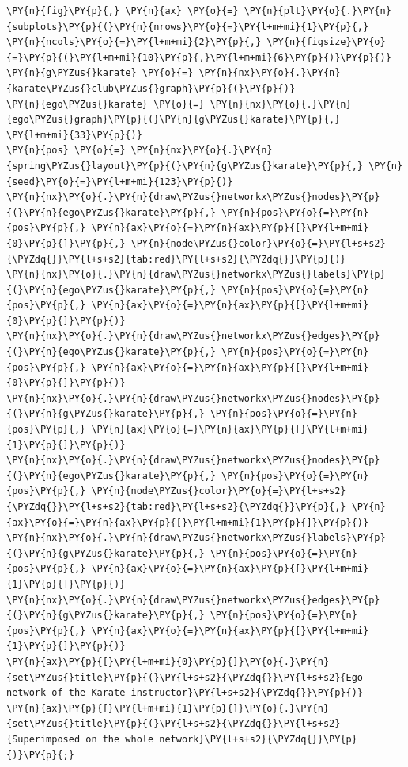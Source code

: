     \begin{tcolorbox}[breakable, size=fbox, boxrule=1pt, pad at break*=1mm,colback=cellbackground, colframe=cellborder]
\begin{Verbatim}[commandchars=\\\{\}]
\PY{n}{fig}\PY{p}{,} \PY{n}{ax} \PY{o}{=} \PY{n}{plt}\PY{o}{.}\PY{n}{subplots}\PY{p}{(}\PY{n}{nrows}\PY{o}{=}\PY{l+m+mi}{1}\PY{p}{,} \PY{n}{ncols}\PY{o}{=}\PY{l+m+mi}{2}\PY{p}{,} \PY{n}{figsize}\PY{o}{=}\PY{p}{(}\PY{l+m+mi}{10}\PY{p}{,}\PY{l+m+mi}{6}\PY{p}{)}\PY{p}{)}
\PY{n}{g\PYZus{}karate} \PY{o}{=} \PY{n}{nx}\PY{o}{.}\PY{n}{karate\PYZus{}club\PYZus{}graph}\PY{p}{(}\PY{p}{)}
\PY{n}{ego\PYZus{}karate} \PY{o}{=} \PY{n}{nx}\PY{o}{.}\PY{n}{ego\PYZus{}graph}\PY{p}{(}\PY{n}{g\PYZus{}karate}\PY{p}{,} \PY{l+m+mi}{33}\PY{p}{)}
\PY{n}{pos} \PY{o}{=} \PY{n}{nx}\PY{o}{.}\PY{n}{spring\PYZus{}layout}\PY{p}{(}\PY{n}{g\PYZus{}karate}\PY{p}{,} \PY{n}{seed}\PY{o}{=}\PY{l+m+mi}{123}\PY{p}{)}
\PY{n}{nx}\PY{o}{.}\PY{n}{draw\PYZus{}networkx\PYZus{}nodes}\PY{p}{(}\PY{n}{ego\PYZus{}karate}\PY{p}{,} \PY{n}{pos}\PY{o}{=}\PY{n}{pos}\PY{p}{,} \PY{n}{ax}\PY{o}{=}\PY{n}{ax}\PY{p}{[}\PY{l+m+mi}{0}\PY{p}{]}\PY{p}{,} \PY{n}{node\PYZus{}color}\PY{o}{=}\PY{l+s+s2}{\PYZdq{}}\PY{l+s+s2}{tab:red}\PY{l+s+s2}{\PYZdq{}}\PY{p}{)}
\PY{n}{nx}\PY{o}{.}\PY{n}{draw\PYZus{}networkx\PYZus{}labels}\PY{p}{(}\PY{n}{ego\PYZus{}karate}\PY{p}{,} \PY{n}{pos}\PY{o}{=}\PY{n}{pos}\PY{p}{,} \PY{n}{ax}\PY{o}{=}\PY{n}{ax}\PY{p}{[}\PY{l+m+mi}{0}\PY{p}{]}\PY{p}{)}
\PY{n}{nx}\PY{o}{.}\PY{n}{draw\PYZus{}networkx\PYZus{}edges}\PY{p}{(}\PY{n}{ego\PYZus{}karate}\PY{p}{,} \PY{n}{pos}\PY{o}{=}\PY{n}{pos}\PY{p}{,} \PY{n}{ax}\PY{o}{=}\PY{n}{ax}\PY{p}{[}\PY{l+m+mi}{0}\PY{p}{]}\PY{p}{)}
\PY{n}{nx}\PY{o}{.}\PY{n}{draw\PYZus{}networkx\PYZus{}nodes}\PY{p}{(}\PY{n}{g\PYZus{}karate}\PY{p}{,} \PY{n}{pos}\PY{o}{=}\PY{n}{pos}\PY{p}{,} \PY{n}{ax}\PY{o}{=}\PY{n}{ax}\PY{p}{[}\PY{l+m+mi}{1}\PY{p}{]}\PY{p}{)}
\PY{n}{nx}\PY{o}{.}\PY{n}{draw\PYZus{}networkx\PYZus{}nodes}\PY{p}{(}\PY{n}{ego\PYZus{}karate}\PY{p}{,} \PY{n}{pos}\PY{o}{=}\PY{n}{pos}\PY{p}{,} \PY{n}{node\PYZus{}color}\PY{o}{=}\PY{l+s+s2}{\PYZdq{}}\PY{l+s+s2}{tab:red}\PY{l+s+s2}{\PYZdq{}}\PY{p}{,} \PY{n}{ax}\PY{o}{=}\PY{n}{ax}\PY{p}{[}\PY{l+m+mi}{1}\PY{p}{]}\PY{p}{)}
\PY{n}{nx}\PY{o}{.}\PY{n}{draw\PYZus{}networkx\PYZus{}labels}\PY{p}{(}\PY{n}{g\PYZus{}karate}\PY{p}{,} \PY{n}{pos}\PY{o}{=}\PY{n}{pos}\PY{p}{,} \PY{n}{ax}\PY{o}{=}\PY{n}{ax}\PY{p}{[}\PY{l+m+mi}{1}\PY{p}{]}\PY{p}{)}
\PY{n}{nx}\PY{o}{.}\PY{n}{draw\PYZus{}networkx\PYZus{}edges}\PY{p}{(}\PY{n}{g\PYZus{}karate}\PY{p}{,} \PY{n}{pos}\PY{o}{=}\PY{n}{pos}\PY{p}{,} \PY{n}{ax}\PY{o}{=}\PY{n}{ax}\PY{p}{[}\PY{l+m+mi}{1}\PY{p}{]}\PY{p}{)}
\PY{n}{ax}\PY{p}{[}\PY{l+m+mi}{0}\PY{p}{]}\PY{o}{.}\PY{n}{set\PYZus{}title}\PY{p}{(}\PY{l+s+s2}{\PYZdq{}}\PY{l+s+s2}{Ego network of the Karate instructor}\PY{l+s+s2}{\PYZdq{}}\PY{p}{)}
\PY{n}{ax}\PY{p}{[}\PY{l+m+mi}{1}\PY{p}{]}\PY{o}{.}\PY{n}{set\PYZus{}title}\PY{p}{(}\PY{l+s+s2}{\PYZdq{}}\PY{l+s+s2}{Superimposed on the whole network}\PY{l+s+s2}{\PYZdq{}}\PY{p}{)}\PY{p}{;}
\end{Verbatim}
\end{tcolorbox}

